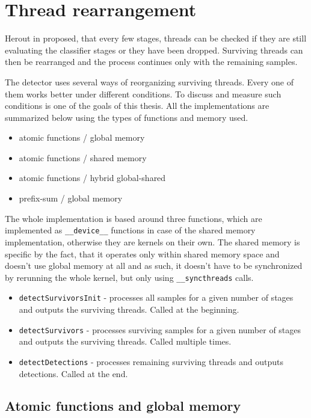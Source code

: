 \section{Thread rearrangement}\label{sec:impl-thread-rearrangement}

Herout in \cite{herout2011real} proposed, that every few stages, threads can be checked if they are still evaluating the classifier stages or they have been dropped. Surviving threads can then be rearranged and the process continues only with the remaining samples.

The detector uses several ways of reorganizing surviving threads. Every one of them works better under different conditions. To discuss and measure such conditions is one of the goals of this thesis. All the implementations are summarized below using the types of functions and memory used.

\begin{itemize}
	\item atomic functions / global memory
	\item atomic functions / shared memory
	\item atomic functions / hybrid global-shared
	\item prefix-sum / global memory
\end{itemize}

The whole implementation is based around three functions, which are implemented as \verb|__device__| functions in case of the shared memory implementation, otherwise they are kernels on their own. The shared memory is specific by the fact, that it operates only within shared memory space and doesn't use global memory at all and as such, it doesn't have to be synchronized by rerunning the whole kernel, but only using \verb|__syncthreads| calls.

\begin{itemize}
	\item \verb|detectSurvivorsInit| - processes all samples for a given number of stages and outputs the surviving threads. Called at the beginning.
	\item \verb|detectSurvivors| - processes surviving samples for a given number of stages and outputs the surviving threads. Called multiple times.
	\item \verb|detectDetections| - processes remaining surviving threads and outputs detections. Called at the end.
\end{itemize}

\subsection{Atomic functions and global memory} \label{subsec:impl-global}

